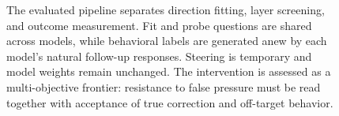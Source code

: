 \begin{figure}[t]
  \caption{
    The evaluated pipeline separates direction fitting, layer screening, and
    outcome measurement. Fit and probe questions are shared across models,
    while behavioral labels are generated anew by each model's natural
    follow-up responses. Steering is temporary and model weights remain
    unchanged. The intervention is assessed as a multi-objective frontier:
    resistance to false pressure must be read together with acceptance of true
    correction and off-target behavior.
  }
  \label{fig:method-pipeline}
\end{figure}
